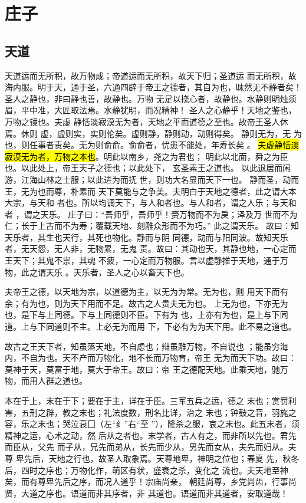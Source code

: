 \section{庄子}

\subsection{天道}

天道运而无所积，故万物成；帝道运而无所积，故天下归；圣道运 而无所积，故海内服。明于天，通于圣，六通四辟于帝王之德者，其自为也，昧然无不静者矣！
圣人之静也，非曰静也善，故静也。万物 无足以挠心者，故静也。水静则明烛须眉，平中准，大匠取法焉。水静犹明，而况精神！
圣人之心静乎！天地之鉴也，万物之镜也。夫虚 静恬淡寂漠无为者，天地之平而道德之至也。故帝王圣人休焉。休则 虚，虚则实，实则伦矣。虚则静，静则动，动则得矣。
静则无为，无 为也，则任事者责矣。无为则俞俞。俞俞者，忧患不能处，年寿长矣 。
\hl{夫虚静恬淡寂漠无为者，万物之本也}。明此以南乡，尧之为君也； 明此以北面，舜之为臣也。以此处上，帝王天子之德也；以此处下， 玄圣素王之道也。
以此退居而闲游，江海山林之士服；以此进为而抚 世，则功大名显而天下一也。
静而圣，动而王，无为也而尊，朴素而 天下莫能与之争美。夫明白于天地之德者，此之谓大本大宗，与天和 者也。所以均调天下，与人和者也。与人和者，谓之人乐；与天和者 ，谓之天乐。
庄子曰：“吾师乎，吾师乎！赍万物而不为戾；泽及万 世而不为仁；长于上古而不为寿；覆载天地、刻雕众形而不为巧。” 此之谓天乐。
故曰：知天乐者，其生也天行，其死也物化。静而与阴 同德，动而与阳同波。故知天乐者，无天怨，无人非，无物累，无鬼 责。故曰：其动也天，其静也地，一心定而王天下；其鬼不祟，其魂 不疲，一心定而万物服。言以虚静推于天地，通于万物，此之谓天乐 。天乐者，圣人之心以畜天下也。

夫帝王之德，以天地为宗，以道德为主，以无为为常。无为也，则 用天下而有余；有为也，则为天下用而不足。故古之人贵夫无为也。 上无为也，下亦无为也，是下与上同德。下与上同德则不臣。下有为 也，上亦有为也，是上与下同道。上与下同道则不主。上必无为而用 下，下必有为为天下用。此不易之道也。

故古之王天下者，知虽落天地，不自虑也；辩虽雕万物，不自说也 ；能虽穷海内，不自为也。天不产而万物化，地不长而万物育，帝王 无为而天下功。故曰：莫神于天，莫富于地，莫大于帝王。故曰：帝 王之德配天地。此乘天地，驰万物，而用人群之道也。

本在于上，末在于下；要在于主，详在于臣。三军五兵之运，德之 末也；赏罚利害，五刑之辟，教之末也；礼法度数，刑名比详，治之 末也；钟鼓之音，羽旄之容，乐之末也；哭泣衰囗（左“纟”右“至 ”），隆杀之服，哀之末也。此五末者，须精神之运，心术之动，然 后从之者也。末学者，古人有之，而非所以先也。君先而臣从，父先 而子从，兄先而弟从，长先而少从，男先而女从，夫先而妇从。夫尊 卑先后，天地之行也，故圣人取象焉。天尊地卑，神明之位也；春夏 先，秋冬后，四时之序也；万物化作，萌区有状，盛衰之杀，变化之 流也。夫天地至神矣，而有尊卑先后之序，而况人道乎！宗庙尚亲， 朝廷尚尊，乡党尚齿，行事尚贤，大道之序也。语道而非其序者，非 其道也。语道而非其道者，安取道哉！

